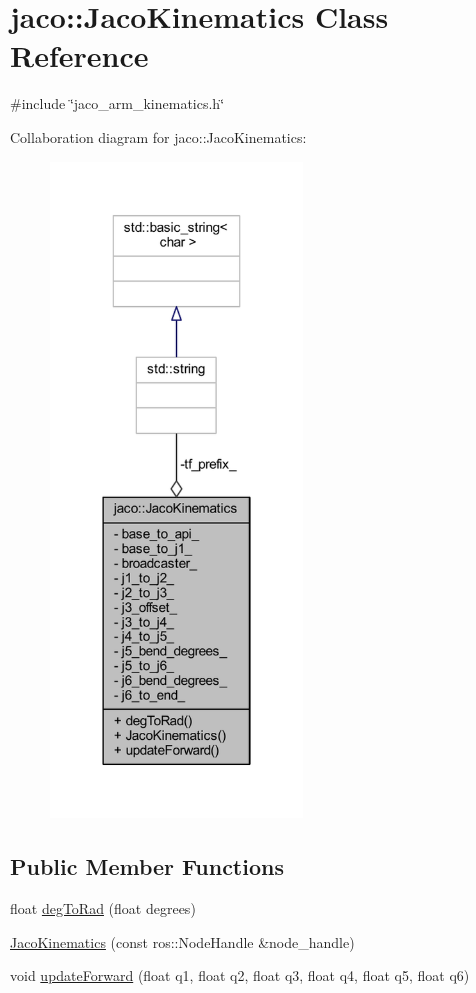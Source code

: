 \hypertarget{classjaco_1_1JacoKinematics}{}\section{jaco\+:\+:Jaco\+Kinematics Class Reference}
\label{classjaco_1_1JacoKinematics}


{\ttfamily \#include \char`\"{}jaco\+\_\+arm\+\_\+kinematics.\+h\char`\"{}}



Collaboration diagram for jaco\+:\+:Jaco\+Kinematics\+:
\nopagebreak
\begin{figure}[H]
\begin{center}
\leavevmode
\includegraphics[width=190pt]{d8/dea/classjaco_1_1JacoKinematics__coll__graph}
\end{center}
\end{figure}
\subsection*{Public Member Functions}
\begin{DoxyCompactItemize}
\item 
float \hyperlink{classjaco_1_1JacoKinematics_a340eda126d97aa3700cc5dc8be89aa39}{deg\+To\+Rad} (float degrees)
\item 
\hyperlink{classjaco_1_1JacoKinematics_ad7c0d6e5dbf5feb29aaf6bcb65f14b86}{Jaco\+Kinematics} (const ros\+::\+Node\+Handle \&node\+\_\+handle)
\item 
void \hyperlink{classjaco_1_1JacoKinematics_a605302243138ca469a7a416be25a6804}{update\+Forward} (float q1, float q2, float q3, float q4, float q5, float q6)
\end{DoxyCompactItemize}
